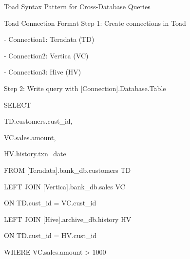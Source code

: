 \documentclass{beamer}
\begin{document}
	
	\begin{frame}{Toad Syntax Pattern for Cross-Database Queries}
		\begin{block}{Toad Connection Format}
			\small
			\color{blue}
			Step 1: Create connections in Toad\par
			- Connection1: Teradata (TD)\par
			- Connection2: Vertica (VC)\par
			- Connection3: Hive (HV)\par
			\vspace{0.2cm}
			Step 2: Write query with [Connection].Database.Table\par
			SELECT\par
			\quad TD.customers.cust\_id,\par
			\quad VC.sales.amount,\par
			\quad HV.history.txn\_date\par
			FROM [Teradata].bank\_db.customers TD\par
			LEFT JOIN [Vertica].bank\_db.sales VC\par
			\quad ON TD.cust\_id = VC.cust\_id\par
			LEFT JOIN [Hive].archive\_db.history HV\par
			\quad ON TD.cust\_id = HV.cust\_id\par
			WHERE VC.sales.amount > 1000
			\color{black}
		\end{block}
	\end{frame}
	
\end{document}
